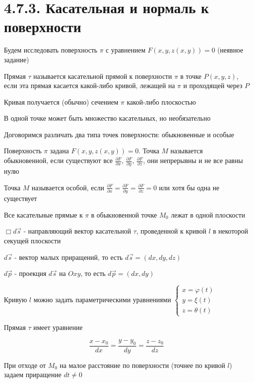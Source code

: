 \documentclass[12pt]{article}
\begin{document}
    \section{4.7.3. Касательная и нормаль к поверхности}

    Будем исследовать поверхность $\pi$ с уравнением $F(x, y, z(x, y)) = 0$ (неявное задание)

    \Def Прямая $\tau$ называется касательной прямой к поверхности $\pi$ в точке $P(x, y, z)$,
    если эта прямая касается какой-либо кривой, лежащей на $\pi$ и проходящей через $P$

    \Nota Кривая получается (обычно) сечением $\pi$ какой-либо плоскостью

    \Nota В одной точке может быть множество касательных, но необязательно

    \Nota Договоримся различать два типа точек поверхности: обыкновенные и особые

    \Def Поверхность $\pi$ задана $F(x, y, z(x, y)) = 0$. Точка $M$ называется обыкновенной, если существуют
    все $\frac{\partial F}{\partial x}$, $\frac{\partial F}{\partial y}$, $\frac{\partial F}{\partial z}$,
    они непрерывны и не все равны нулю

    \Def Точка $M$ называется особой, если $\frac{\partial F}{\partial x} = \frac{\partial F}{\partial y} = \frac{\partial F}{\partial z} = 0$
    или хотя бы одна не существует

    \Th Все касательные прямые к $\pi$ в обыкновенной точке $M_0$ лежат в одной плоскости

    $\Box d \overrightarrow{s}$ - направляющий вектор касательной $\tau$, проведенной к кривой $l$ в некоторой секущей плоскости

    $d \overrightarrow{s}$ - вектор малых приращений, то есть $d \overrightarrow{s} = (dx, dy, dz)$

    $d \overrightarrow{p}$ - проекция $d \overrightarrow{s}$ на $Oxy$, то есть $d \overrightarrow{p} = (dx, dy)$

    Кривую $l$ можно задать параметрическими уравнениями $\begin{cases}x = \varphi(t) \\ y = \xi(t) \\ z = \theta(t)\end{cases}$

    Прямая $\tau$ имеет уравнение

    \[\frac{x - x_0}{dx} = \frac{y - y_0}{dy} = \frac{z - z_0}{dz}\]

    При отходе от $M_0$ на малое расстояние по поверхности (точнее по кривой $l$) задаем приращение $dt \neq 0$
\end{document}
